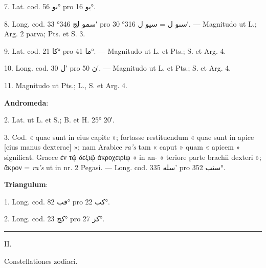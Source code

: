 \documentclass[11pt]{article}
\begin{document}
{\small
\par\hangindent=12mm 7. Lat. cod. \textarabic{نو} 56° pro \textarabic{يو} 16°.
\par\hangindent=12mm 8. Long. cod. \textarabic{سمو لج} 346° 33′ pro \textarabic{سٮو ل} = \textarabic{سيو ل} 316° 30′. — Magnitudo ut L.; Arg. 2 parva; Pts. et S. 3.
\par\hangindent=12mm 9. Lat. cod. \textarabic{كا} 21° pro \textarabic{ما} 41°. — Magnitudo ut L. et Pts.; S. et Arg. 4.
\par\hangindent=12mm 10. Long. cod. \textarabic{ل} 30′ pro \textarabic{ن} 50′. — Magnitudo ut L. et Pts.; S. et Arg. 4.
\par\hangindent=12mm 11. Magnitudo ut Pts.; L., S. et Arg. 4.
\par\hspace*{8mm}\textbf{Andromeda}:
\par\hangindent=12mm 2. Lat. ut L. et S.; B. et H. 25° 20′.
\par\hangindent=12mm 3. Cod. « quae sunt in eius capite »; fortasse restituendum « quae sunt in apice [eius manus dexterae] »; nam Arabice \textit{ra’s} tam « caput » quam « apicem » significat. Graece ἐν τῷ δεξιῷ ἀκροχειρίῳ « in an- « teriore parte brachii dexteri »; ἄκρον = \textit{ra’s} ut in nr. 2 Pegasi. — Long. cod. \textarabic{سله} 335’ pro \textarabic{سنب} 352°.
\par\hspace*{8mm}\textbf{Triangulum}:
\par\hangindent=12mm 1. Long. cod. \textarabic{فب} 82° pro \textarabic{كب} 22°.
\par\hangindent=12mm 2. Long. cod. \textarabic{كج} 23° pro \textarabic{كز} 27°.
\par}
\clearpage
\noindent{}\par\vspace{-1mm}\noindent\rule{\textwidth}{.4pt}\par\vspace{2mm}
\begin{center}II.\end{center}
\begin{center}Constellationes zodiaci.\end{center}
\end{document}
